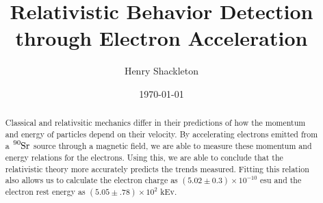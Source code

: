 \usepackage{graphicx}      %
\usepackage{lipsum}
\usepackage{float}
\usepackage{bm}            %
\usepackage{physics}
\usepackage{tensor}
\usepackage[colorlinks=true]{hyperref}  %




\title{Relativistic Behavior Detection through Electron Acceleration}
\author{Henry Shackleton}
\date{\today}


\begin{abstract}
  Classical and relativsitic mechanics differ in their predictions of how the momentum and energy of particles depend on their velocity. By accelerating electrons emitted from a $\tensor*[^{90}]{\text{Sr}}{}$ source through a magnetic field, we are able to measure these momentum and energy relations for the electrons. Using this, we are able to conclude that the relativistic theory more accurately predicts the trends measured. Fitting this relation also allows us to calculate the electron charge as $(5.02 \pm 0.3) \times 10^{-10}$ esu and the electron rest energy as $(5.05 \pm .78) \times 10^{2}$ kEv.
\end{abstract}

\maketitle
